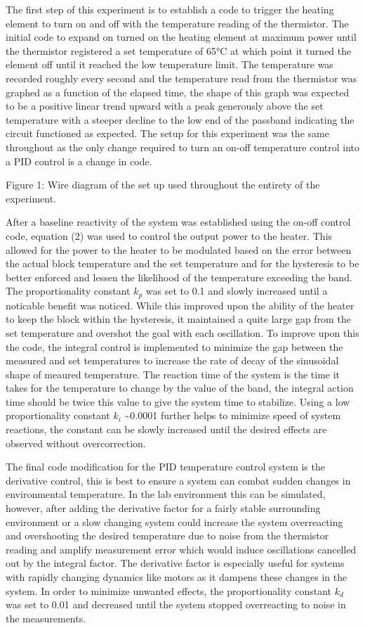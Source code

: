\documentclass[11pt]{article}
\begin{document}
    The first step of this experiment is to establish a code to trigger the
heating element to turn on and off with the temperature reading of the
thermistor. The initial code to expand on turned on the heating element
at maximum power until the thermistor registered a set temperature of
65°C at which point it turned the element off until it reached the low
temperature limit. The temperature was recorded roughly every second and
the temperature read from the thermistor was graphed as a function of
the elapsed time, the shape of this graph was expected to be a positive
linear trend upward with a peak generously above the set temperature
with a steeper decline to the low end of the passband indicating the
circuit functioned as expected. The setup for this experiment was the
same throughout as the only change required to turn an on-off
temperature control into a PID control is a change in code.

    Figure 1: Wire diagram of the set up used throughout the entirety of the
experiment.

    After a baseline reactivity of the system was established using the
on-off control code, equation (2) was used to control the output power
to the heater. This allowed for the power to the heater to be modulated
based on the error between the actual block temperature and the set
temperature and for the hysteresis to be better enforced and lessen the
likelihood of the temperature exceeding the band. The proportionality
constant \(k_p\) was set to 0.1 and slowly increased until a noticable
benefit was noticed. While this improved upon the ability of the heater
to keep the block within the hysteresis, it maintained a quite large gap
from the set temperature and overshot the goal with each oscillation. To
improve upon this the code, the integral control is implemented to
minimize the gap between the measured and set temperatures to increase
the rate of decay of the sinusoidal shape of meaured temperature. The
reaction time of the system is the time it takes for the temperature to
change by the value of the band, the integral action time should be
twice this value to give the system time to stabilize. Using a low
proportionality constant \(k_i\) \textasciitilde0.0001 further helps to
minimize speed of system reactions, the constant can be slowly increased
until the desired effects are observed without overcorrection.

The final code modification for the PID temperature control system is
the derivative control, this is best to ensure a system can combat
sudden changes in environmental temperature. In the lab environment this
can be simulated, however, after adding the derivative factor for a
fairly stable surrounding environment or a slow changing system could
increase the system overreacting and overshooting the desired
temperature due to noise from the thermistor reading and amplify
measurement error which would induce oscillations cancelled out by the
integral factor. The derivative factor is especially useful for systems
with rapidly changing dynamics like motors as it dampens these changes
in the system. In order to minimize unwanted effects, the
proportionality constant \(k_d\) was set to 0.01 and decreased until the
system stopped overreacting to noise in the measurements.
\end{document}
